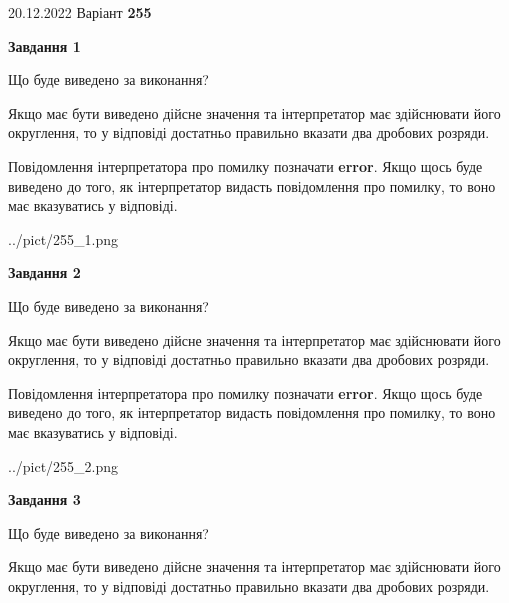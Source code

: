 \documentclass[12pt, ukrainian]{article}
\begin{document}
{20.12.2022 Варіант \No \textbf { 255 }\par}
{
\begin {Large}

{\begin {center}\textbf{Завдання 1}\end {center}}\par
Що буде виведено за виконання? \par

Якщо має бути виведено дійсне значення та інтерпретатор має здійснювати його округлення, 
то у відповіді достатньо правильно вказати два дробових розряди.

Повідомлення інтерпретатора про помилку позначати \textbf{error}.
Якщо щось буде виведено до того, як інтерпретатор видасть повідомлення про помилку, 
то воно має вказуватись у відповіді. \par

\begin{center}
	{../pict/255_1.png}
\end{center}
\newpage

{\begin {center}\textbf{Завдання 2}\end {center}}\par
Що буде виведено за виконання? \par

Якщо має бути виведено дійсне значення та інтерпретатор має здійснювати його округлення, 
то у відповіді достатньо правильно вказати два дробових розряди.

Повідомлення інтерпретатора про помилку позначати \textbf{error}.
Якщо щось буде виведено до того, як інтерпретатор видасть повідомлення про помилку, 
то воно має вказуватись у відповіді. \par

\begin{center}
	{../pict/255_2.png}
\end{center}
\newpage

{\begin {center}\textbf{Завдання 3}\end {center}}\par
Що буде виведено за виконання? \par

Якщо має бути виведено дійсне значення та інтерпретатор має здійснювати його округлення, 
то у відповіді достатньо правильно вказати два дробових розряди.


\end{Large}}
\end{document}
